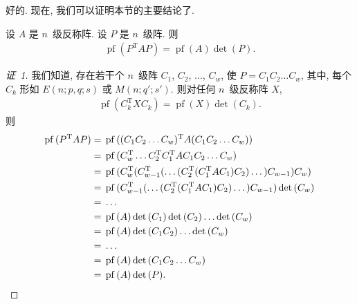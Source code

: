 \documentclass[../libro.tex]{subfiles}
\begin{document}
好的.
现在, 我们可以证明本节的主要结论了.

\begin{theorem}
    设 \(A\) 是 \(n\)~级反称阵.
    设 \(P\) 是 \(n\)~级阵.
    则
    \begin{align*}
        \operatorname{pf} {(P^{\mathrm{T}} A P)}
        = \operatorname{pf} {(A)} \det {(P)}.
    \end{align*}
\end{theorem}

\begin{proof}[证~1]
    我们知道,
    存在若干个 \(n\)~级阵
    \(C_1\), \(C_2\), \(\dots\), \(C_w\),
    使 \(P = C_1 C_2 \dots C_w\),
    其中, 每个 \(C_k\) 形如
    \(E(n; p, q; s)\) 或 \(M(n; q'; s')\).
    则对任何 \(n\)~级反称阵 \(X\),
    \begin{align*}
        \operatorname{pf} {(C_k^{\mathrm{T}} X C_k)}
        = \operatorname{pf} {(X)} \det {(C_k)}.
    \end{align*}
    则
    \begin{align*}
        \operatorname{pf} {(P^{\mathrm{T}} A P)}
        = {} &
        \operatorname{pf} {(
                (C_1 C_2 \dots C_w)^{\mathrm{T}} A
                (C_1 C_2 \dots C_w)
        )}
        \\
        = {} &
        \operatorname{pf} {(
                C_w^{\mathrm{T}} \dots C_2^{\mathrm{T}}
                C_1^{\mathrm{T}} A
                C_1 C_2 \dots C_w
        )}
        \\
        = {} &
        \operatorname{pf} {
            (C_w^{\mathrm{T}}
                (C_{w-1}^{\mathrm{T}}
                    (\dots
                        (C_2^{\mathrm{T}}
                            (C_1^{\mathrm{T}}
                                A
                            C_1)
                        C_2)
                    \dots)
                C_{w-1})
            C_w)
        }
        \\
        = {} &
        \operatorname{pf} {
            (C_{w-1}^{\mathrm{T}}
                (\dots
                    (C_2^{\mathrm{T}}
                        (C_1^{\mathrm{T}}
                            A
                        C_1)
                    C_2)
                \dots)
            C_{w-1})
        }
        \det {(C_w)}
        \\
        = {} &
        \dots
        \\
        = {} &
        \operatorname{pf} {(A)}
        \det {(C_1)} \det {(C_2)} \dots \det {(C_w)}
        \\
        = {} &
        \operatorname{pf} {(A)}
        \det {(C_1 C_2)} \dots \det {(C_w)}
        \\
        = {} &
        \dots
        \\
        = {} &
        \operatorname{pf} {(A)}
        \det {(C_1 C_2 \dots C_w)}
        \\
        = {} &
        \operatorname{pf} {(A)}
        \det {(P)}.
        \qedhere
    \end{align*}
\end{proof}
\end{document}

